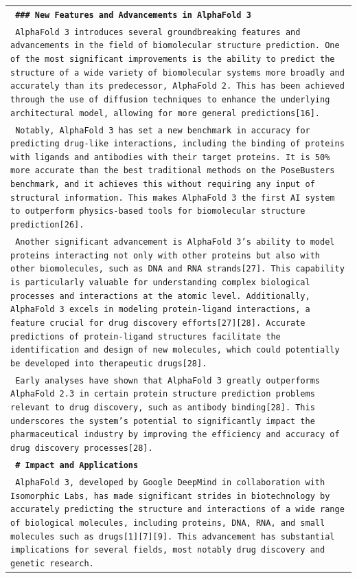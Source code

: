 \documentclass[11pt]{article}
\begin{document}
\begin{longtable}{p{\textwidth}}
\vspace{1pt}
\texttt{\small{\textbf{ \#\#\# New Features and Advancements in AlphaFold 3 }}} \\
\texttt{\small{ AlphaFold 3 introduces several groundbreaking features and advancements in the field of biomolecular structure prediction. One of the most significant improvements is the ability to predict the structure of a wide variety of biomolecular systems more broadly and accurately than its predecessor, AlphaFold 2. This has been achieved through the use of diffusion techniques to enhance the underlying architectural model, allowing for more general predictions[16]. }} \\
\texttt{\small{ Notably, AlphaFold 3 has set a new benchmark in accuracy for predicting drug-like interactions, including the binding of proteins with ligands and antibodies with their target proteins. It is 50\% more accurate than the best traditional methods on the PoseBusters benchmark, and it achieves this without requiring any input of structural information. This makes AlphaFold 3 the first AI system to outperform physics-based tools for biomolecular structure prediction[26]. }} \\
\texttt{\small{ Another significant advancement is AlphaFold 3's ability to model proteins interacting not only with other proteins but also with other biomolecules, such as DNA and RNA strands[27]. This capability is particularly valuable for understanding complex biological processes and interactions at the atomic level. Additionally, AlphaFold 3 excels in modeling protein-ligand interactions, a feature crucial for drug discovery efforts[27][28]. Accurate predictions of protein-ligand structures facilitate the identification and design of new molecules, which could potentially be developed into therapeutic drugs[28]. }} \\
\texttt{\small{ Early analyses have shown that AlphaFold 3 greatly outperforms AlphaFold 2.3 in certain protein structure prediction problems relevant to drug discovery, such as antibody binding[28]. This underscores the system's potential to significantly impact the pharmaceutical industry by improving the efficiency and accuracy of drug discovery processes[28]. }} \\
\vspace{1pt}
\texttt{\small{\textbf{ \# Impact and Applications }}} \\
\texttt{\small{ AlphaFold 3, developed by Google DeepMind in collaboration with Isomorphic Labs, has made significant strides in biotechnology by accurately predicting the structure and interactions of a wide range of biological molecules, including proteins, DNA, RNA, and small molecules such as drugs[1][7][9]. This advancement has substantial implications for several fields, most notably drug discovery and genetic research. }} \\

\end{longtable}
\end{document}
